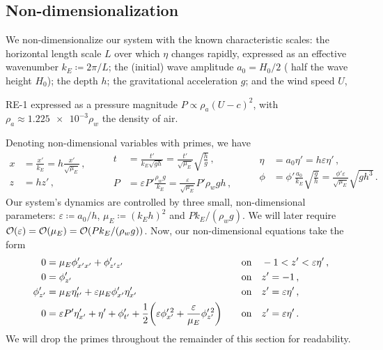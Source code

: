 \documentclass{jfm}
\renewcommand*{\epsilon}{\varepsilon}
\begin{document}
\subsection{\label{sec:nondim} Non-dimensionalization}
We non-dimensionalize our system with the known characteristic
scales: the horizontal length scale $L$ over which $\eta$ changes
rapidly, expressed as an effective wavenumber $k_E \coloneqq 2 \pi/L$;
the (initial) wave amplitude $a_0 = H_0/2$ (\ie{} half the wave height
$H_0$); the depth $h$; the gravitational acceleration $g$; and the wind
speed $U$,
\begin{LineLabel}{RE-1}
expressed as a pressure magnitude $P \propto \rho_a (U-c)^2$,
with $\rho_a \approx \num{1.225e-3} \rho_w$ the density of air.
\end{LineLabel}
Denoting non-dimensional variables with primes, we have
\begin{equation}
  \begin{aligned}
  x &= \frac{x'}{k_E} = h \frac{x'}{\sqrt{\mu_E}}\,, \\
  z &= h z' \,,
  \end{aligned}
  \qquad
  \begin{aligned}
  t &= \frac{t'}{k_E\sqrt{g h}}
    = \frac{t'}{\sqrt{\mu_E}} \sqrt{\frac{h}{g}} \,, \\
  P &= \epsilon P' \frac{\rho_w g}{k_E}
    = \frac{\epsilon}{\sqrt{\mu_E}} P' \rho_w g h \,,
  \end{aligned}
  \qquad
  \begin{aligned}
  \eta &= a_0 \eta' = h \epsilon \eta' \,, \\
  \phi &= \phi'\frac{a_0}{k_E}\sqrt{\frac{g}{h}}
    = \frac{\phi'\epsilon}{\sqrt{\mu_E}}\sqrt{g h^3} \,.
  \end{aligned}
\end{equation}
Our system's dynamics are controlled by three small, non-dimensional
parameters: $\epsilon \coloneqq a_0/h$, $\mu_E \coloneqq (k_E h)^2$ and
$P k_E/(\rho_w g)$.
We will later require $\order{\epsilon} = \order{\mu_E} =
\order{Pk_E/(\rho_w g)}$.
Now, our non-dimensional equations take the form
\begin{alignat}{2}
  0 &= \mu_E \phi'_{x'x'} + \phi'_{z'z'} &&\qq{on}
    -1 < z' < \epsilon \eta' \,, \label{eq:laplace_nondim} \\
  0 &= \phi'_{z'} &&\qq{on} z'=-1 \,, \label{eq:bottom_bc_nondim} \\
  \phi'_{z'} &= \mu_E \eta'_{t'} +
    \epsilon \mu_E \phi'_{x'} \eta'_{x'} &&\qq{on} z' = \epsilon \eta' \,,
    \label{eq:kinematic_bc_nondim} \\
  0 &= \epsilon P' \eta'_{x'} +  \eta' + \phi'_{t'} + \frac{1}{2}
    \pqty{\epsilon \phi_{x'}^{\prime \, 2} + \frac{\epsilon}{\mu_E}
    \phi_{z'}^{\prime \, 2}} &&\qq{on} z'= \epsilon \eta' \,.
    \label{eq:dynamic_bc_nondim}
\end{alignat}
We will drop the primes throughout the remainder of this section for readability.
\end{document}

